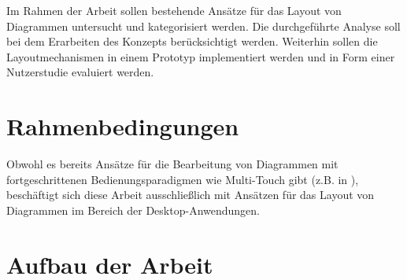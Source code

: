 
Im Rahmen der Arbeit sollen bestehende Ansätze für das Layout von Diagrammen untersucht und kategorisiert werden. Die durchgeführte Analyse soll bei dem Erarbeiten des Konzepts berücksichtigt werden. Weiterhin sollen die Layoutmechanismen in einem Prototyp implementiert werden und in Form einer Nutzerstudie evaluiert werden.


\section{Rahmenbedingungen}
\label{sec:thesis-conditions}

Obwohl es bereits Ansätze für die Bearbeitung von Diagrammen mit fortgeschrittenen Bedienungsparadigmen wie Multi-Touch gibt (z.B. in \cite{FrischHeydekorn10Diagram}), beschäftigt sich diese Arbeit ausschließlich mit Ansätzen für das Layout von Diagrammen im Bereich der Desktop-Anwendun\-gen.


\section{Aufbau der Arbeit}

